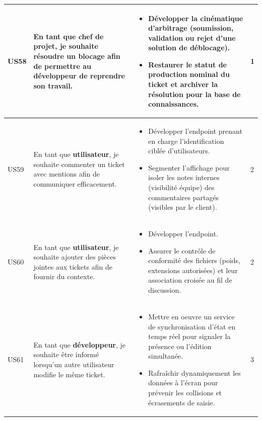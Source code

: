 \begin{longtable}{|C{1cm}|L{5.6cm}|L{8cm}|C{0.85cm}|}
US58 & En tant que \textbf{chef de projet}, je souhaite résoudre un blocage afin de permettre au développeur de reprendre son travail. &
\begin{itemize}[nosep, left=0pt, label={$\bullet$}]
\item Développer la cinématique d'arbitrage (soumission, validation ou rejet d'une solution de déblocage).
\item Restaurer le statut de production nominal du ticket et archiver la résolution pour la base de connaissances.
\end{itemize} & 1 \\
\hline

US59 & En tant que \textbf{utilisateur}, je souhaite commenter un ticket avec mentions afin de communiquer efficacement. &
\begin{itemize}[nosep, left=0pt, label={$\bullet$}]
\item Développer l'endpoint prenant en charge l'identification ciblée d'utilisateurs.
\item Segmenter l'affichage pour isoler les notes internes (visibilité équipe) des commentaires partagés (visibles par le client).
\end{itemize} & 2 \\
\hline

US60 & En tant que \textbf{utilisateur}, je souhaite ajouter des pièces jointes aux tickets afin de fournir du contexte. &
\begin{itemize}[nosep, left=0pt, label={$\bullet$}]
\item Développer l'endpoint.
\item Assurer le contrôle de conformité des fichiers (poids, extensions autorisées) et leur association croisée au fil de discussion.
\end{itemize} & 2 \\
\hline

US61 & En tant que \textbf{développeur}, je souhaite être informé lorsqu'un autre utilisateur modifie le même ticket. &
\begin{itemize}[nosep, left=0pt, label={$\bullet$}]
\item Mettre en oeuvre un service de synchronisation d'état en temps réel pour signaler la présence ou l'édition simultanée.
\item Rafraîchir dynamiquement les données à l'écran pour prévenir les collisions et écrasements de saisie.
\end{itemize} & 3 \\
\hline


\end{longtable}
